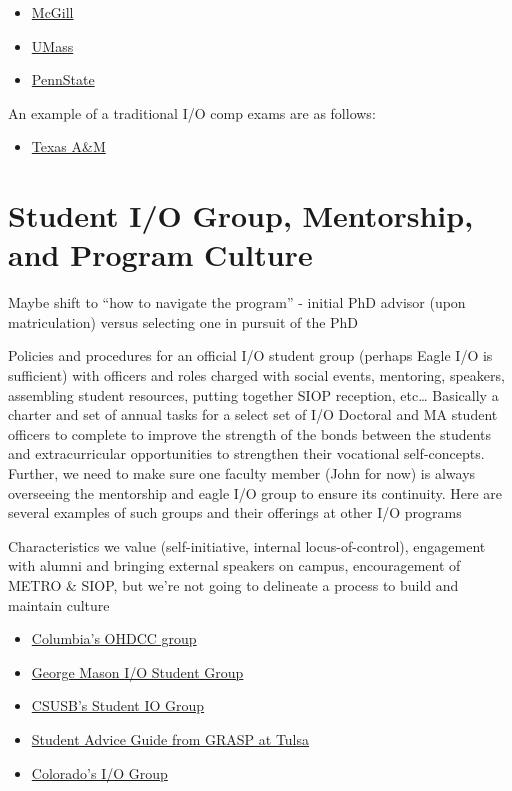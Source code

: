 \documentclass[
]{book}
\providecommand{\tightlist}{%
  \setlength{\itemsep}{0pt}\setlength{\parskip}{0pt}}
\begin{document}
\begin{itemize}
\tightlist
\item
  \href{https://www.mcgill.ca/socialwork/prospective/phd/comprehensive-exam}{McGill}
\item
  \href{https://www.umass.edu/communication/node/861}{UMass}
\item
  \href{http://gradschool.psu.edu/graduate-education-policies/gcac/gcac-600/gcac-604-qualifying-exam/}{PennState}
\end{itemize}

An example of a traditional I/O comp exams are as follows:

\begin{itemize}
\tightlist
\item
  \href{https://liberalarts.tamu.edu/wp-content/uploads/sites/2/2018/02/I-O-area-comps-policy-Nov-16th-2015.pdf}{Texas A\&M}
\end{itemize}

\hypertarget{culture}{%
\chapter{Student I/O Group, Mentorship, and Program Culture}\label{culture}}

Maybe shift to ``how to navigate the program'' - initial PhD advisor (upon matriculation) versus selecting one in pursuit of the PhD

Policies and procedures for an official I/O student group (perhaps Eagle I/O is sufficient) with officers and roles charged with social events, mentoring, speakers, assembling student resources, putting together SIOP reception, etc\ldots{} Basically a charter and set of annual tasks for a select set of I/O Doctoral and MA student officers to complete to improve the strength of the bonds between the students and extracurricular opportunities to strengthen their vocational self-concepts. Further, we need to make sure one faculty member (John for now) is always overseeing the mentorship and eagle I/O group to ensure its continuity. Here are several examples of such groups and their offerings at other I/O programs

Characteristics we value (self-initiative, internal locus-of-control), engagement with alumni and bringing external speakers on campus, encouragement of METRO \& SIOP, but we're not going to delineate a process to build and maintain culture

\begin{itemize}
\tightlist
\item
  \href{http://ohdcc.org/}{Columbia's OHDCC group}
\item
  \href{https://io.gmu.edu/iopsa}{George Mason I/O Student Group}
\item
  \href{https://artsandsciences.utulsa.edu/wp-content/uploads/sites/6/2015/02/GRASP-Handbook-2015-2016.pdf}{CSUSB's Student IO Group}
\item
  \href{https://artsandsciences.utulsa.edu/wp-content/uploads/sites/6/2015/02/GRASP-Handbook-2015-2016.pdf}{Student Advice Guide from GRASP at Tulsa}
\item
  \href{http://iopac.colostate.edu/}{Colorado's I/O Group}
\end{itemize}
\end{document}
